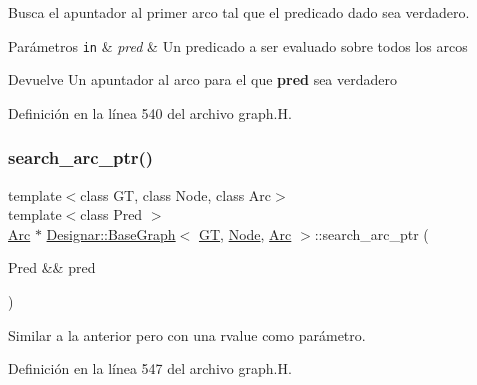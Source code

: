 Busca el apuntador al primer arco tal que el predicado dado sea verdadero. 


\begin{DoxyParams}[1]{Parámetros}
\mbox{\tt in}  & {\em pred} & Un predicado a ser evaluado sobre todos los arcos \\
\hline
\end{DoxyParams}
\begin{DoxyReturn}{Devuelve}
Un apuntador al arco para el que {\bfseries pred} sea verdadero 
\end{DoxyReturn}


Definición en la línea 540 del archivo graph.\+H.

\mbox{\label{class_designar_1_1_base_graph_a6d7036b2c4b78dcc46de3fc0d314b871}} 
\subsubsection{\texorpdfstring{search\+\_\+arc\+\_\+ptr()}{search\_arc\_ptr()}\hspace{0.1cm}{\footnotesize\ttfamily [2/2]}}
{\footnotesize\ttfamily template$<$class GT, class Node, class Arc$>$ \\
template$<$class Pred $>$ \\
\hyperlink{namespace_designar_a3f55fb5513d62ff47cbc8f72b8e95d6f}{Arc} $\ast$ \hyperlink{class_designar_1_1_base_graph}{Designar\+::\+Base\+Graph}$<$ \hyperlink{demo-buildgraph_8_c_a3001c40d2c31ca87ed96cd7d1334a55e}{GT}, \hyperlink{namespace_designar_a5af326c65aa2bd26b26c410f2030d09e}{Node}, \hyperlink{namespace_designar_a3f55fb5513d62ff47cbc8f72b8e95d6f}{Arc} $>$\+::search\+\_\+arc\+\_\+ptr (\begin{DoxyParamCaption}\item[{Pred \&\&}]{pred }\end{DoxyParamCaption})\hspace{0.3cm}{\ttfamily [inline]}}



Similar a la anterior pero con una rvalue como parámetro. 



Definición en la línea 547 del archivo graph.\+H.

\mbox{\label{class_designar_1_1_base_graph_aa15b13f58a4961b1593045d1e228adec}} 

